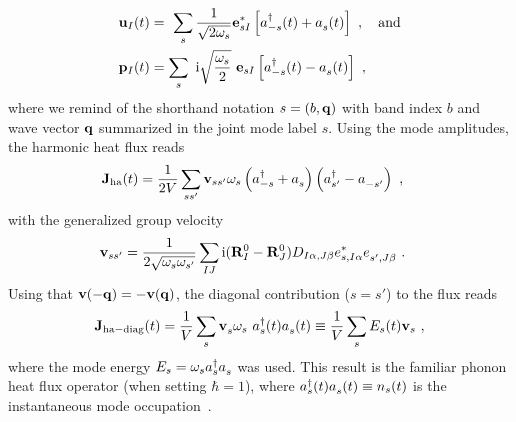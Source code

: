 \begin{align}
    \b u_I (t) 
	    &= ~\sum_s \frac{1}{\sqrt{2 \omega_s}} \b e^\ast_{s I} \left[ \D a_{-s} (t) + \fD a_s (t)\right]~,\quad\text{and} \\
	  \b p_I (t) 
		  &= \sum_s ~\im \sqrt{\frac{\omega_s}{2}} ~ {\b e}_{s I} \left[ \D a_{-s} (t) - \fD a_s (t) \right]~,
\end{align}
where we remind of the shorthand notation $s = (b, {\bf q})$ with band index $b$ and wave vector $\bf q$ summarized in the joint mode label $s$. Using the mode amplitudes, the harmonic heat flux reads
\begin{align}
    \b J_{\rm ha} (t) 
	    &= \frac{1}{2V} \sum_{ss'} \b v_{ss'} \omega_{s} \left( \D a_{-s} + \fD a_{s}  \right) \left( \D a_{s'} - \fD a_{-s'}  \right)~,
	  \label{eq:J.ha}
\end{align}
with the generalized group velocity
\begin{align}
	\b v_{ss'}
		&= \frac{1}{2 \sqrt{\omega_s \omega_{s'}}} \sum_{IJ} \im (\b R^0_I - \b R^0_J) D_{I \alpha, J \beta} e^\ast_{s, I \alpha} \fD e_{s', J \beta}~.
\end{align}
Using that ${\bf v} (- {\bf q}) = - {\bf v} ({\bf q})$, %
the diagonal contribution ($s=s'$) to the flux reads
\begin{align}
	\b J_{\rm ha-diag} (t) 
		= \frac{1}{V} \sum_{s} \fD {\b v}_{s} \omega_{s} ~ \D a_s (t) \fD a_s (t)
		\equiv \frac{1}{V} \sum_{s} E_s (t)  {\bf v}_{s}~,
	\label{eq:J.ha.diag}
\end{align}
where the mode energy $E_s = \omega_s \D a_s \fD a_s$ was used.
This result is the familiar phonon heat flux operator (when setting $\hbar = 1$), where $\D a_s (t) \fD a_s (t) \equiv n_s(t)$ is the instantaneous mode occupation~\cite{Peierls1929,Hardy1963,Isaeva2019}.

